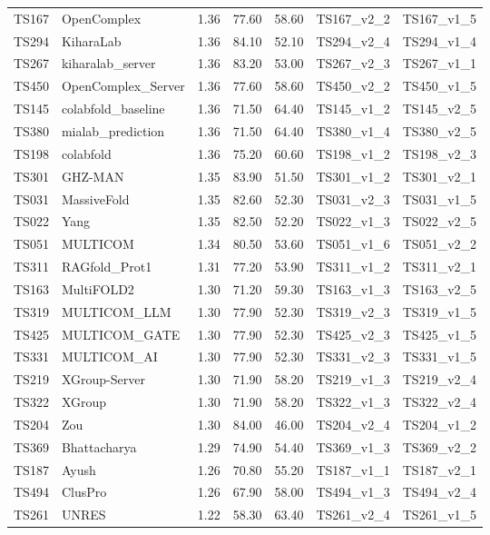 \begin{table}[ht]
{\begin{tabular}{llrrrll}
TS167 & OpenComplex & 1.36 & 77.60 & 58.60 & TS167\_v2\_2 & TS167\_v1\_5 \\ 
TS294 & KiharaLab & 1.36 & 84.10 & 52.10 & TS294\_v2\_4 & TS294\_v1\_4 \\ 
TS267 & kiharalab\_server & 1.36 & 83.20 & 53.00 & TS267\_v2\_3 & TS267\_v1\_1 \\ 
TS450 & OpenComplex\_Server & 1.36 & 77.60 & 58.60 & TS450\_v2\_2 & TS450\_v1\_5 \\ 
TS145 & colabfold\_baseline & 1.36 & 71.50 & 64.40 & TS145\_v1\_2 & TS145\_v2\_5 \\ 
TS380 & mialab\_prediction & 1.36 & 71.50 & 64.40 & TS380\_v1\_4 & TS380\_v2\_5 \\ 
TS198 & colabfold & 1.36 & 75.20 & 60.60 & TS198\_v1\_2 & TS198\_v2\_3 \\ 
TS301 & GHZ-MAN & 1.35 & 83.90 & 51.50 & TS301\_v1\_2 & TS301\_v2\_1 \\ 
TS031 & MassiveFold & 1.35 & 82.60 & 52.30 & TS031\_v2\_3 & TS031\_v1\_5 \\ 
TS022 & Yang & 1.35 & 82.50 & 52.20 & TS022\_v1\_3 & TS022\_v2\_5 \\ 
TS051 & MULTICOM & 1.34 & 80.50 & 53.60 & TS051\_v1\_6 & TS051\_v2\_2 \\ 
TS311 & RAGfold\_Prot1 & 1.31 & 77.20 & 53.90 & TS311\_v1\_2 & TS311\_v2\_1 \\ 
TS163 & MultiFOLD2 & 1.30 & 71.20 & 59.30 & TS163\_v1\_3 & TS163\_v2\_5 \\ 
TS319 & MULTICOM\_LLM & 1.30 & 77.90 & 52.30 & TS319\_v2\_3 & TS319\_v1\_5 \\ 
TS425 & MULTICOM\_GATE & 1.30 & 77.90 & 52.30 & TS425\_v2\_3 & TS425\_v1\_5 \\ 
TS331 & MULTICOM\_AI & 1.30 & 77.90 & 52.30 & TS331\_v2\_3 & TS331\_v1\_5 \\ 
TS219 & XGroup-Server & 1.30 & 71.90 & 58.20 & TS219\_v1\_3 & TS219\_v2\_4 \\ 
TS322 & XGroup & 1.30 & 71.90 & 58.20 & TS322\_v1\_3 & TS322\_v2\_4 \\ 
TS204 & Zou & 1.30 & 84.00 & 46.00 & TS204\_v2\_4 & TS204\_v1\_2 \\ 
TS369 & Bhattacharya & 1.29 & 74.90 & 54.40 & TS369\_v1\_3 & TS369\_v2\_2 \\ 
TS187 & Ayush & 1.26 & 70.80 & 55.20 & TS187\_v1\_1 & TS187\_v2\_1 \\ 
TS494 & ClusPro & 1.26 & 67.90 & 58.00 & TS494\_v1\_3 & TS494\_v2\_4 \\ 
TS261 & UNRES & 1.22 & 58.30 & 63.40 & TS261\_v2\_4 & TS261\_v1\_5 \\ 

\end{tabular}}
\end{table}
